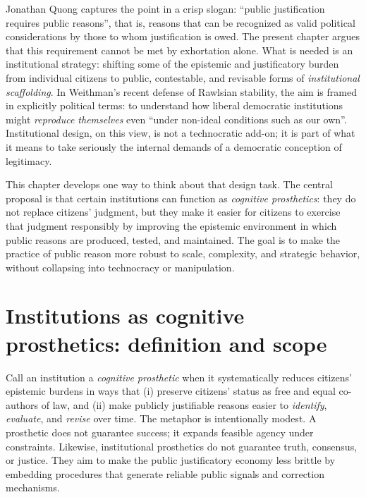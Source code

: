 \documentclass[12pt]{report}
\begin{document}
Jonathan Quong captures the point in a crisp slogan: \enquote{public justification requires public reasons}, that is, reasons that can be recognized as valid political considerations by those to whom justification is owed. \parencite[p.~10]{quong2011liberalism}
The present chapter argues that this requirement cannot be met by exhortation alone.
What is needed is an institutional strategy: shifting some of the epistemic and justificatory burden from individual citizens to public, contestable, and revisable forms of \emph{institutional scaffolding}.
In Weithman’s recent defense of Rawlsian stability, the aim is framed in explicitly political terms: to understand how liberal democratic institutions might \emph{reproduce themselves} even \enquote{under non-ideal conditions such as our own}. \parencite[p.~1188]{Weithman2024Rescuing}
Institutional design, on this view, is not a technocratic add-on; it is part of what it means to take seriously the internal demands of a democratic conception of legitimacy.

This chapter develops one way to think about that design task. 
The central proposal is that certain institutions can function as \emph{cognitive prosthetics}: they do not replace citizens’ judgment, but they make it easier for citizens to exercise that judgment responsibly by improving the epistemic environment in which public reasons are produced, tested, and maintained.
The goal is to make the practice of public reason more robust to scale, complexity, and strategic behavior, without collapsing into technocracy or manipulation.

\section{Institutions as cognitive prosthetics: definition and scope}

Call an institution a \emph{cognitive prosthetic} when it systematically reduces citizens’ epistemic burdens in ways that (i) preserve citizens’ status as free and equal co-authors of law, and (ii) make publicly justifiable reasons easier to \emph{identify}, \emph{evaluate}, and \emph{revise} over time.
The metaphor is intentionally modest.
A prosthetic does not guarantee success; it expands feasible agency under constraints.
Likewise, institutional prosthetics do not guarantee truth, consensus, or justice.
They aim to make the public justificatory economy less brittle by embedding procedures that generate reliable public signals and correction mechanisms.
\end{document}
